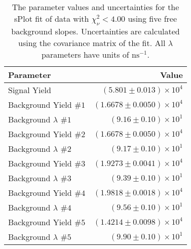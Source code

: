 
\begin{table}[ht]
    \begin{center}
        \begin{tabular}{lr}\toprule
            Parameter & Value \\\midrule
            Signal Yield & $(5.801 \pm 0.013) \times 10^{4}$ \\
            Background Yield $\#1$ & $(1.6678 \pm 0.0050) \times 10^{4}$ \\
            Background $\lambda$ $\#1$ & $(9.16 \pm 0.10) \times 10^{1}$ \\
            Background Yield $\#2$ & $(1.6678 \pm 0.0050) \times 10^{4}$ \\
            Background $\lambda$ $\#2$ & $(9.17 \pm 0.10) \times 10^{1}$ \\
            Background Yield $\#3$ & $(1.9273 \pm 0.0041) \times 10^{4}$ \\
            Background $\lambda$ $\#3$ & $(9.39 \pm 0.10) \times 10^{1}$ \\
            Background Yield $\#4$ & $(1.9818 \pm 0.0018) \times 10^{4}$ \\
            Background $\lambda$ $\#4$ & $(9.56 \pm 0.10) \times 10^{1}$ \\
            Background Yield $\#5$ & $(1.4214 \pm 0.0098) \times 10^{4}$ \\
            Background $\lambda$ $\#5$ & $(9.90 \pm 0.10) \times 10^{1}$ \\\bottomrule
        \end{tabular}
        \caption{The parameter values and uncertainties for the sPlot fit of data with $\chi^2_\nu < 4.00$ using five free background slopes. Uncertainties are calculated using the covariance matrix of the fit. All $\lambda$ parameters have units of $\si{\nano\second}^{-1}$.}\label{tab:splot-fit-results-chisqdof-4.00-free-5}
    \end{center}
\end{table}
